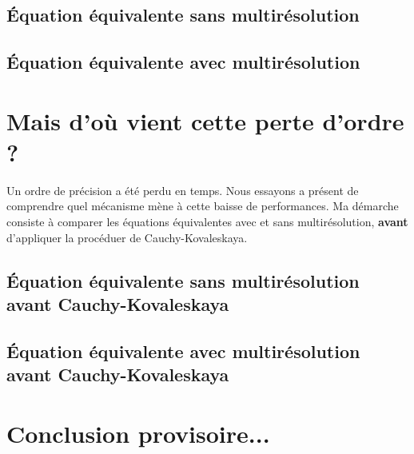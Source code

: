 \documentclass[11pt]{article}
\theoremstyle{definition}
\theoremstyle{remark}
\begin{document}
    \subsection{Équation équivalente sans multirésolution}
    
    \subsection{Équation équivalente avec multirésolution}
    

\newpage
\section{Mais d'où vient cette perte d'ordre ?}
    Un ordre de précision a été perdu en temps. Nous essayons a présent de comprendre quel mécanisme mène à cette baisse de performances.
    Ma démarche consiste à comparer les équations équivalentes avec et sans multirésolution, \textbf{avant} d'appliquer la procéduer de Cauchy-Kovaleskaya.
    \subsection{Équation équivalente sans multirésolution avant Cauchy-Kovaleskaya}
    
    \subsection{Équation équivalente avec multirésolution avant Cauchy-Kovaleskaya}
    

\section{Conclusion provisoire...}
    

\printbibliography
\end{document}

